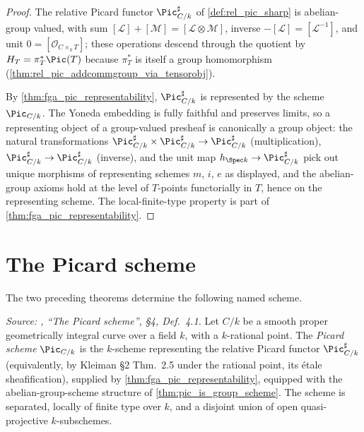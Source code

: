 \begin{proof}
\leanok
  The relative Picard functor \(\Pic^\sharp_{C/k}\) of
  \cref{def:rel_pic_sharp} is abelian-group valued, with sum
  \([\mathcal{L}] + [\mathcal{M}] = [\mathcal{L} \otimes \mathcal{M}]\),
  inverse \(-[\mathcal{L}] = [\mathcal{L}^{-1}]\), and unit
  \(0 = [\mathcal{O}_{C \times_k T}]\); these operations descend through
  the quotient by \(H_T = \pi_T^*\Pic(T)\) because \(\pi_T^*\) is itself a
  group homomorphism (\cref{thm:rel_pic_addcommgroup_via_tensorobj}).

  By \cref{thm:fga_pic_representability}, \(\Pic^\sharp_{C/k}\) is
  represented by the scheme \(\Pic_{C/k}\). The Yoneda embedding is fully
  faithful and preserves limits, so a representing object of a
  group-valued presheaf is canonically a group object: the natural
  transformations
  $\Pic^\sharp_{C/k} \times \Pic^\sharp_{C/k} \to \Pic^\sharp_{C/k}$
  (multiplication), \(\Pic^\sharp_{C/k} \to \Pic^\sharp_{C/k}\) (inverse),
  and the unit map \(h_{\Spec k} \to \Pic^\sharp_{C/k}\) pick out unique
  morphisms of representing schemes \(m\), \(i\), \(e\) as displayed, and
  the abelian-group axioms hold at the level of \(T\)-points functorially
  in \(T\), hence on the representing scheme. The local-finite-type
  property is part of \cref{thm:fga_pic_representability}.
\end{proof}

\section{The Picard scheme}
\label{sec:fga_pic_named_definition}

The two preceding theorems determine the following named scheme.

\begin{definition}\leanok
  \label{def:pic_scheme}

  \textit{Source: \cite{kleiman-picard}, ``The Picard scheme'', \S 4, Def.~4.1.}
  Let \(C/k\) be a smooth proper geometrically integral curve over a field
  \(k\), with a \(k\)-rational point. The \emph{Picard scheme} \(\Pic_{C/k}\)
  is the \(k\)-scheme representing the relative Picard functor
  \(\Pic^\sharp_{C/k}\) (equivalently, by Kleiman \S 2 Thm.~2.5 under the
  rational point, its \'etale sheafification), supplied by
  \cref{thm:fga_pic_representability}, equipped with the abelian-group-scheme
  structure of \cref{thm:pic_is_group_scheme}. The scheme is separated,
  locally of finite type over \(k\), and a disjoint union of open
  quasi-projective \(k\)-subschemes.
\end{definition}

